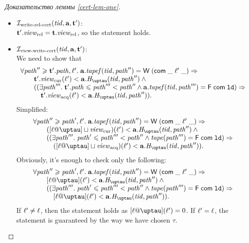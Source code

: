 \begin{proof}[Доказательство леммы \ref{cert-lem-one}]
\begin{itemize}
\begin{itemize}
        \item $\mathcal{I}_{\textup{\rm write-rel-cert}}(\mathit{tid}, \mathbf{a}, \mathbf{t}')$: \\
          $\mathbf{t}'.\mathit{view}_{\mathrm{rel}} = \mathbf{t}.\mathit{view}_{\mathrm{rel}}$, so the statement holds.

        \item $\mathcal{I}_{\textup{\rm view-write-cert}}(\mathit{tid}, \mathbf{a}, \mathbf{t}')$: \\
          We need to show that
          \[\begin{array}{l}
            \forall \cpath'' \ge \tT'.\cpath, \loc'. \;
              \aT.\tapef(\tId, \cpath'') = \tapeWrite{(\tapeWriteCommitted{\_}{\loc'}{\_})} \Rightarrow \\
          \qquad \tT'.\Rcur(\loc') < \aT.\tmap(\tId, \cpath'') \land {} \\
          \qquad ((\exists \cpath'''. \; \tT'.\cpath \le \cpath''' < \cpath'' \land 
                       \aT.\tapef(\tId, \cpath''') = \tapeFence{\Committed}{\LD}) \Rightarrow \\
          \qquad \quad \tT'.\Racq(\loc') < \aT.\tmap(\tId, \cpath'')).\\
          \end{array}\]
          Simplified:
          \[\begin{array}{l}
            \forall \cpath'' \ge \cpath', \loc'. \;
              \aT.\tapef(\tId, \cpath'') = \tapeWrite{(\tapeWriteCommitted{\_}{\loc'}{\_})} \Rightarrow \\
          \qquad ([\loc @ \tau] \sqcup \Rcur)(\loc') < \aT.\tmap(\tId, \cpath'') \land {} \\
          \qquad ((\exists \cpath'''. \; \cpath' \le \cpath''' < \cpath'' \land 
                       \tape(\cpath''') = \tapeFence{\Committed}{\LD}) \Rightarrow \\
          \qquad \quad ([\loc @ \tau] \sqcup \Racq)(\loc') < \aT.\tmap(\tId, \cpath'')).\\
          \end{array}\]
          Obviously, it's enough to check only the following:
          \[\begin{array}{l}
            \forall \cpath'' \ge \cpath', \loc'. \;
              \aT.\tapef(\tId, \cpath'') = \tapeWrite{(\tapeWriteCommitted{\_}{\loc'}{\_})} \Rightarrow \\
          \qquad [\loc @ \tau](\loc') < \aT.\tmap(\tId, \cpath'') \land {} \\
          \qquad ((\exists \cpath'''. \; \cpath' \le \cpath''' < \cpath'' \land 
                       \tape(\cpath''') = \tapeFence{\Committed}{\LD}) \Rightarrow \\
          \qquad \quad [\loc @ \tau](\loc') < \aT.\tmap(\tId, \cpath'')).\\
          \end{array}\]
          If $\ell' \not = \ell$, then the statement holds as $[\loc @ \tau](\loc') = 0$.
          If $\ell' = \ell$, the statement is guaranteed by the way we have chosen $\tau$.


\end{itemize}
\end{itemize}
\end{proof}
